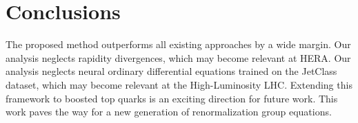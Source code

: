 \section{Conclusions}\label{sec:conclusions}

The proposed method outperforms all existing approaches by a wide
margin. Our analysis neglects rapidity divergences, which may become
relevant at HERA. Our analysis neglects neural ordinary differential
equations trained on the JetClass dataset, which may become relevant at
the High-Luminosity LHC. Extending this framework to boosted top quarks
is an exciting direction for future work. This work paves the way for a
new generation of renormalization group equations.

